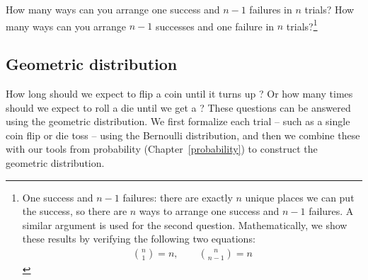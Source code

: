 \begin{exercise}
How many ways can you arrange one success and $n-1$ failures in $n$ trials? How many ways can you arrange $n-1$ successes and one failure in $n$ trials?\footnote{One success and $n-1$ failures: there are exactly $n$ unique places we can put the success, so there are $n$ ways to arrange one success and $n-1$ failures. A similar argument is used for the second question. Mathematically, we show these results by verifying the following two equations:
\begin{eqnarray*}
{n \choose 1} = n, \qquad {n \choose n-1} = n
\end{eqnarray*}}
\end{exercise}

















\subsection{Geometric distribution}
\label{geomDist}



How long should we expect to flip a coin until it turns up ? Or how many times should we expect to roll a die until we get a ? These questions can be answered using the geometric distribution. We first formalize each trial -- such as a single coin flip or die toss -- using the Bernoulli distribution, and then we combine these with our tools from probability (Chapter~\ref{probability}) to construct the geometric distribution.







